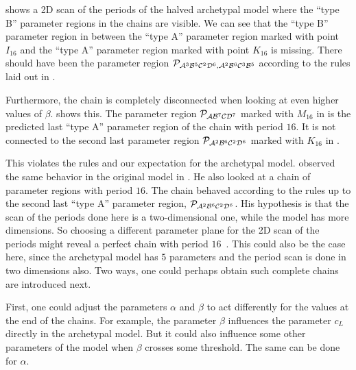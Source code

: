  shows a 2D scan of the periods of the halved archetypal model where the ``type B'' parameter regions in the chains are visible.
We can see that the ``type B'' parameter region in  between the ``type A'' parameter region marked with point $I_{16}$ and the ``type A'' parameter region marked with point $K_{16}$ is missing.
There should have been the parameter region $\mathcal{P}_{\mathcal{A}^3\mathcal{B}^5\mathcal{C}^2\mathcal{D}^6, \mathcal{A}^2\mathcal{B}^6\mathcal{C}^3\mathcal{B}^5}$ according to the rules laid out in .

Furthermore, the chain is completely disconnected when looking at even higher values of $\beta$.
 shows this.
The parameter region $\mathcal{P}_{\mathcal{A}\mathcal{B}^7\mathcal{C}\mathcal{D}^7}$ marked with $M_{16}$ in  is the predicted last ``type A'' parameter region of the chain with period $16$.
It is not connected to the second last parameter region $\mathcal{P}_{\mathcal{A}^2\mathcal{B}^6\mathcal{C}^2\mathcal{D}^6}$ marked with $K_{16}$ in .

This violates the rules and our expectation for the archetypal model.
 observed the same behavior in the original model in \cite{akyuz2022}.
He also looked at a chain of parameter regions with period $16$.
The chain behaved according to the rules up to the second last ``type A'' parameter region, $\mathcal{P}_{\mathcal{A}^2\mathcal{B}^6\mathcal{C}^2\mathcal{D}^6}$.
His hypothesis is that the scan of the periods done here is a two-dimensional one, while the model has more dimensions.
So choosing a different parameter plane for the 2D scan of the periods might reveal a perfect chain with period $16$~\cite{akyuz2022}.
This could also be the case here, since the archetypal model has $5$ parameters and the period scan is done in two dimensions also.
Two ways, one could perhaps obtain such complete chains are introduced next.

First, one could adjust the parameters $\alpha$ and $\beta$ to act differently for the values at the end of the chains.
For example, the parameter $\beta$ influences the parameter $c_L$ directly in the archetypal model.
But it could also influence some other parameters of the model when $\beta$ crosses some threshold.
The same can be done for $\alpha$.

